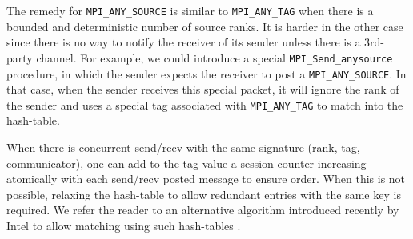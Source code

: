 The remedy for \texttt{MPI_ANY_SOURCE} is similar to \texttt{MPI_ANY_TAG} when
there is a bounded and deterministic number of source ranks. It is harder in
the other case since there is no way to notify the receiver of its sender
unless there is a 3rd-party channel. For example, we could introduce a special
\texttt{MPI_Send_anysource} procedure, in which the sender expects the receiver
to post a \texttt{MPI_ANY_SOURCE}. In that case, when the sender receives this
special packet, it will ignore the rank of the sender and uses a special tag
associated with \texttt{MPI_ANY_TAG} to match into the hash-table.

When there is concurrent send/recv with the same signature (rank, tag,
communicator), one can add to the tag value a session counter increasing
atomically with each send/recv posted message to ensure order. When this is not
possible, relaxing the hash-table to allow redundant entries with the same key
is required. We refer the reader to an alternative algorithm introduced
recently by Intel to allow matching using such hash-tables \cite{m5}. 
